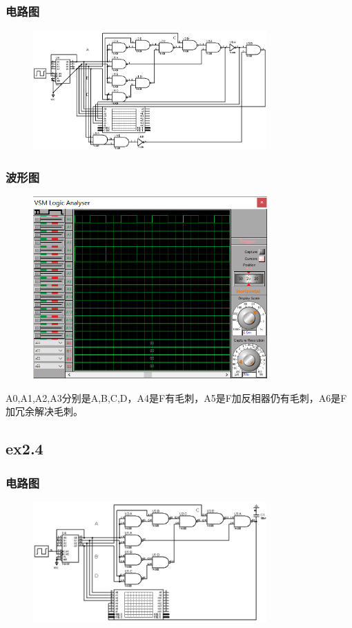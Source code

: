 \documentclass[UTF8, a4paper, 11pt]{article}
\begin{document}
\subsubsection{电路图}
\begin{figure}[H]
    \centering
    \includegraphics[width=0.8\textwidth]{ex2.3电路图.jpg}
\end{figure}
\subsubsection{波形图}
\begin{figure}[H]
    \centering
    \includegraphics[width=0.8\textwidth]{ex2.3波形图.png}
\end{figure}
A0,A1,A2,A3分别是A,B,C,D，A4是F有毛刺，A5是F加反相器仍有毛刺，A6是F加冗余解决毛刺。
\subsection{ex2.4}
\subsubsection{电路图}
\begin{figure}[H]
    \centering
    \includegraphics[width=0.8\textwidth]{ex2.4电路图.jpg}
\end{figure}
\end{document}
